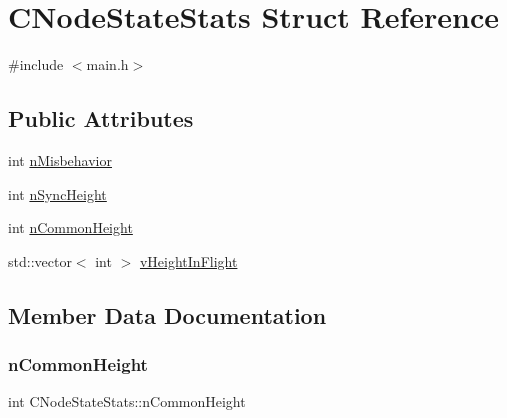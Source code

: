 \hypertarget{struct_c_node_state_stats}{}\section{C\+Node\+State\+Stats Struct Reference}
\label{struct_c_node_state_stats}


{\ttfamily \#include $<$main.\+h$>$}

\subsection*{Public Attributes}
\begin{DoxyCompactItemize}
\item 
int \mbox{\hyperlink{struct_c_node_state_stats_a62c2243d09166c1daaad84519700da3c}{n\+Misbehavior}}
\item 
int \mbox{\hyperlink{struct_c_node_state_stats_a7646deac801098e973a5bc50202f92cd}{n\+Sync\+Height}}
\item 
int \mbox{\hyperlink{struct_c_node_state_stats_a67c910a57285a63bbf0bb88ea7a9ca05}{n\+Common\+Height}}
\item 
std\+::vector$<$ int $>$ \mbox{\hyperlink{struct_c_node_state_stats_a4b03fd8ecaa9268f7eca836e5e79c35a}{v\+Height\+In\+Flight}}
\end{DoxyCompactItemize}


\subsection{Member Data Documentation}
\mbox{\label{struct_c_node_state_stats_a67c910a57285a63bbf0bb88ea7a9ca05}} 
\subsubsection{\texorpdfstring{n\+Common\+Height}{nCommonHeight}}
{\footnotesize\ttfamily int C\+Node\+State\+Stats\+::n\+Common\+Height}

\mbox{\label{struct_c_node_state_stats_a62c2243d09166c1daaad84519700da3c}} 
